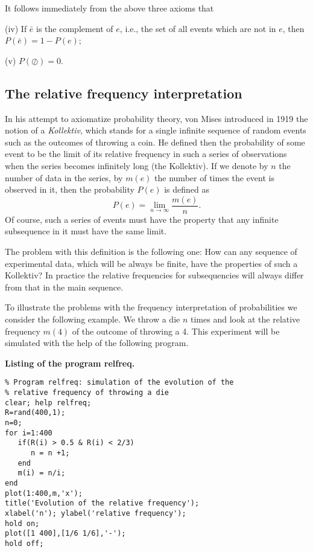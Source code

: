 It follows immediately from the above three axioms that

(iv) If $\bar{e}$ is the complement of $e$, i.e., the set of all 
events which are not in $e$, then
$P(\bar{e}) = 1- P(e)$;

(v) $P(\oslash) = 0$.



\subsection{The relative frequency interpretation}
In his attempt to axiomatize probability theory, von Mises
introduced in 1919 the notion of a {\em Kollektiv}, which stands
for a single infinite sequence of random events such as the 
outcomes of throwing a coin. He defined then the probability of some 
event to be the limit of its relative frequency in such a series of 
observations when the series becomes infinitely long (the 
Kollektiv). If we denote by $n$ the number of data in the series,
by $m(e)$ the number of times the event is observed in it, then
the probability $P(e)$ is defined as
\begin{equation}
P(e) = \lim_{n \rightarrow \infty} \frac{m(e)}{n}.
\end{equation}
Of course, such a series of events must have the property that any 
infinite subsequence in it must have the same limit. 

The problem with this definition is the following one: How can any 
sequence of experimental data, which will be always be finite, 
have the properties of such a Kollektiv? In practice the 
relative frequencies for subsequencies will always differ from 
that in the main sequence.

To illustrate the problems with the frequency interpretation of
probabilities we consider the following example. We throw a die 
$n$ times and
look at the relative frequency $m(4)$ of the outcome of throwing a 
4. This experiment will be simulated with the help of the 
following program.

{\bf Listing of the program relfreq.}
\begin{verbatim}
% Program relfreq: simulation of the evolution of the
% relative frequency of throwing a die
clear; help relfreq;
R=rand(400,1);
n=0;
for i=1:400
   if(R(i) > 0.5 & R(i) < 2/3) 
      n = n +1;
   end
   m(i) = n/i;
end
plot(1:400,m,'x');
title('Evolution of the relative frequency');
xlabel('n'); ylabel('relative frequency');
hold on;
plot([1 400],[1/6 1/6],'-');
hold off;
\end{verbatim}



